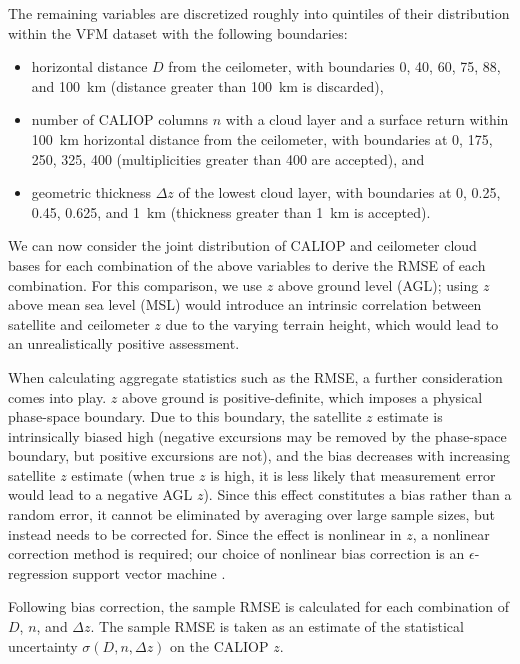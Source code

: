 \documentclass[essd,manuscript]{copernicus}\usepackage[]{graphicx}\usepackage[]{color}
\newcommand\CBH{\ensuremath{z}}
\begin{document}
The remaining variables are discretized roughly into quintiles of their
distribution within the VFM dataset with the
following boundaries:
\begin{itemize}
\item horizontal distance $D$ from the ceilometer, with boundaries 0, 40, 60,
  75, 88, and 100~km (distance greater than 100~km is discarded),
\item number of CALIOP columns $n$ with a cloud layer and a surface return
  within 100~km horizontal distance from the ceilometer, with boundaries at 0,
  175, 250, 325, 400 (multiplicities greater than 400 are accepted), and
\item geometric thickness $\Delta z$ of the lowest cloud layer, with boundaries
  at 0, 0.25, 0.45, 0.625, and 1~km (thickness greater than 1~km is accepted).
\end{itemize}

We can now consider the joint distribution of CALIOP and ceilometer cloud bases
for each combination of the above variables to derive the RMSE of each
combination.  For this comparison, we use \CBH{} above ground level (AGL); using
\CBH{} above mean sea level (MSL) would introduce an intrinsic correlation between
satellite and ceilometer \CBH{} due to the varying terrain height, which would lead
to an unrealistically positive assessment.

When calculating aggregate statistics such as the RMSE, a further consideration
comes into play.  \CBH{} above ground is positive-definite, which imposes a
physical phase-space boundary.  Due to this boundary, the satellite \CBH{} estimate
is intrinsically biased high (negative excursions may be removed by the
phase-space boundary, but positive excursions are not), and the bias decreases
with increasing satellite \CBH{} estimate (when true \CBH{} is high, it is less likely
that measurement error would lead to a negative AGL \CBH{}).  Since this effect
constitutes a bias rather than a random error, it cannot be eliminated by
averaging over large sample sizes, but instead needs to be corrected for.  Since
the effect is nonlinear in \CBH{}, a nonlinear correction method is required; our
choice of nonlinear bias correction is an $\epsilon$-regression support vector
machine \citep[SVM,][]{svm}.

Following bias correction, the sample RMSE is calculated for each combination of
$D$, $n$, and $\Delta z$.  The sample RMSE is taken as an estimate of the
statistical uncertainty $\sigma(D,n,\Delta z)$ on the CALIOP \CBH{}.
\end{document}
